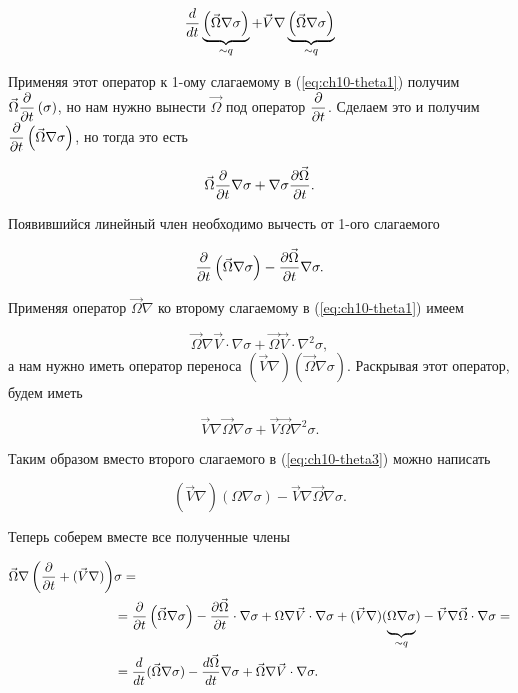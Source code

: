 \begin{equation*}
    \displaystyle\frac{d }{d t} \underbrace{\displaystyle \left(  \vec\Omega\nabla\sigma  \right)}_{\sim q} + \vec{V}\nabla \underbrace{\displaystyle \left( \vec{\Omega}\nabla\sigma \right)}_{\sim q}
\end{equation*}

Применяя этот оператор к 1-ому слагаемому в (\ref{eq:ch10-theta1}) получим $ \vec{\Omega}\displaystyle\frac{\partial }{\partial t} \displaystyle \left( \sigma \right)$, но нам нужно вынести $\vec\Omega$ под оператор $\displaystyle\frac{\partial }{\partial t}$. Сделаем это и получим $\displaystyle\frac{\partial }{\partial t} \displaystyle \left( \vec{\Omega}\nabla\sigma \right)$, но тогда это есть 

\begin{equation*}
    \vec{\Omega}\displaystyle\frac{\partial }{\partial t}\nabla\sigma + \nabla\sigma\displaystyle\frac{\partial \vec{\Omega}}{\partial t}.
\end{equation*}

Появившийся линейный член необходимо вычесть от 1-ого слагаемого

\begin{equation}
    \label{eq:ch10-theta2}
    \displaystyle\frac{\partial }{\partial t} \displaystyle \left(  \vec{\Omega}\nabla\sigma  \right) - \displaystyle\frac{\partial \vec{\Omega}}{\partial t}\nabla\sigma.
\end{equation}

Применяя оператор $\vec{\Omega}\nabla$ ко второму слагаемому в (\ref{eq:ch10-theta1}) имеем

\begin{equation}
    \label{eq:ch10-theta3}
    \vec{\Omega}\nabla\vec{V}\cdot\nabla\sigma + \vec{\Omega}\vec{V}\cdot\nabla^2\sigma,
\end{equation}
а нам нужно иметь оператор переноса $(\vec{V}\nabla)(\vec{\Omega}\nabla\sigma)$. Раскрывая этот оператор, будем иметь

\begin{equation*}
    \vec{V}\nabla\vec{\Omega}\nabla\sigma + \vec{V}\vec{\Omega}\nabla^2\sigma.
\end{equation*}

Таким образом вместо второго слагаемого в (\ref{eq:ch10-theta3}) можно написать

\begin{equation*}
    (\vec{V}\nabla) (\Omega\nabla\sigma) - \vec{V}\nabla\vec{\Omega}\nabla\sigma.
\end{equation*}

Теперь соберем вместе все полученные члены

\begin{align*} 
    \vec{\Omega}\nabla \rb{ \pd{}{t} + (\vec{V}\nabla) }&\sigma = \\
 &= \pd{}{t} \rb{\vec{\Omega}\nabla\sigma} - 
    \pd{\vec{\Omega}}{t}\cdot\nabla\sigma + 
    \Omega\nabla\vec{V}\cdot\nabla\sigma + 
    (\vec{V}\nabla) (\underbrace{\vphantom{\td{}{t}}\Omega\nabla\sigma}_{\sim q}) - 
    \vec{V}\nabla\vec{\Omega}\cdot\nabla\sigma = \\ 
 &= \td{}{t}(\vec{\Omega}\nabla\sigma) - 
    \td{\vec{\Omega}}{t}\nabla\sigma + 
    \vec{\Omega}\nabla\vec{V}\cdot\nabla\sigma.
\end{align*}


